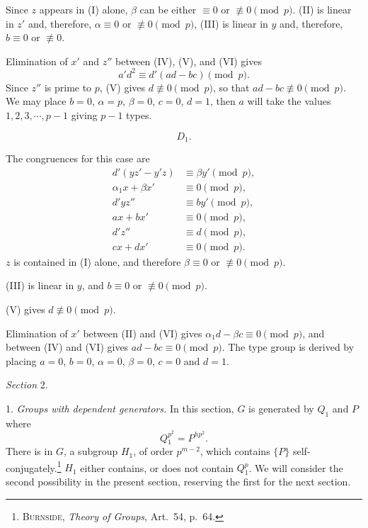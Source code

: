 \documentclass[oneside]{article}
\begin{document}
Since $z$ appears in (I) alone, $\beta$ can be either $\equiv 0$ or
$\not\equiv 0 \pmod{p}$. (II) is linear in $z'$ and, therefore, $\alpha
\equiv 0$ or $\not\equiv 0 \pmod{p}$, (III) is linear in $y$ and,
therefore, $b \equiv 0$ or $\not\equiv 0$.

Elimination of $x'$ and $z''$ between (IV), (V), and (VI) gives
\begin{equation*}
a'd^2 \equiv d'(ad - bc) \pmod{p}.
\end{equation*}
\noindent Since $z''$ is prime to $p$, (V) gives $d \not\equiv 0 \pmod{p}$, so that
$ad - bc \not\equiv 0 \pmod{p}$. We may place $b = 0$, $\alpha = p$,
$\beta = 0$, $c = 0$, $d = 1$, then $a$ will take the values $1, 2, 3, \cdots,
p - 1$ giving $p - 1$ types.

\medskip
\begin{equation*} D_1. \end{equation*}

The congruences for this case are
\begin{align*}
d'(yz' - y'z) &\equiv \beta y' \pmod{p},  \tag{I} \\
\alpha_1 x + \beta x' &\equiv 0 \pmod{p}, \tag{II} \\
d'yz'' &\equiv by' \pmod{p},              \tag{III} \\
ax + bx' &\equiv 0 \pmod{p},              \tag{IV} \\
d'z'' &\equiv d \pmod{p},                 \tag{V} \\
cx + dx' &\equiv 0 \pmod{p}.              \tag{VI}
\end{align*}
\noindent $z$ is contained in (I) alone, and therefore $\beta \equiv 0$ or
$\not\equiv 0 \pmod{p}$.

(III) is linear in $y$, and $b \equiv 0$ or $\not\equiv 0 \pmod{p}$.

(V) gives $d \not\equiv 0 \pmod{p}$.

Elimination of $x'$ between (II) and (VI) gives $\alpha_1 d - \beta c
\equiv 0 \pmod{p}$, and between (IV) and (VI) gives $ad - bc \equiv 0
\pmod{p}$. The type group is derived by placing $a = 0$, $b = 0$, $\alpha = 0$,
$\beta = 0$, $c = 0$ and $d = 1$.

\bigskip
\begin{center}
\large\textit{Section} 2. \normalsize
\end{center}
\setcounter{equation}{0}

1. \textit{Groups with dependent generators.} In this section, $G$ is generated
by $Q_1$ and $P$ where
\begin{equation}
Q{}_1^{p^2} = P^{hp^2}. %
\end{equation}
\noindent There is in $G$, a subgroup $H_1$, of order $p^{m-2}$, which contains $\{P\}$
self-con\-ju\-gate\-ly.\footnote{\textsc{Burnside}, \textit{Theory of Groups},
Art.\ 54, p.\ 64.} $H_1$ either contains, or does not contain $Q{}_1^p$. We will
consider the second possibility in the present section, reserving the first for
the next section.
\end{document}
